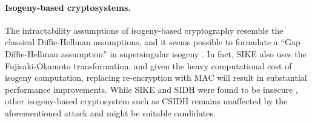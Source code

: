 \documentclass[journal=tches,submission]{iacrtrans}
\begin{document}
\paragraph{Isogeny-based cryptosystems.} The intractability assumptions of isogeny-based cryptography resemble the classical Diffie-Hellman assumptions, and it seems possible to formulate a ``Gap Diffie-Hellman assumption'' in supersingular isogeny \cite{DBLP:conf/icisc/FujiokaTTY18}. In fact, SIKE \cite{azarderakhsh2017supersingular} also uses the Fujisaki-Okamoto transformation, and given the heavy computational cost of isogeny computation, replacing re-encryption with MAC will result in substantial performance improvements. While SIKE and SIDH were found to be insecure \cite{DBLP:conf/eurocrypt/CastryckD23}, other isogeny-based cryptosystem such as CSIDH \cite{DBLP:conf/asiacrypt/Castryck0MPR18} remains unaffected by the aforementioned attack and might be suitable candidates.




\end{document}
